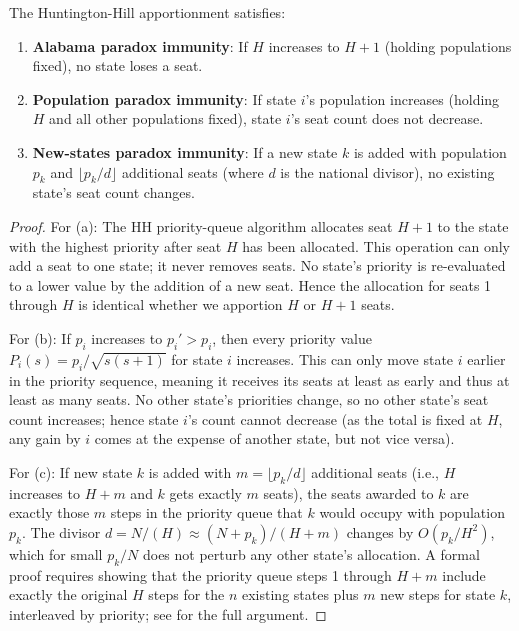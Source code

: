 \begin{theorem}
  \label{thm:hh-paradox-free}
  The Huntington-Hill apportionment satisfies:
  \begin{enumerate}
    \item[(a)] \textbf{Alabama paradox immunity}: If $H$ increases to $H+1$
      (holding populations fixed), no state loses a seat.
    \item[(b)] \textbf{Population paradox immunity}: If state $i$'s
      population increases (holding $H$ and all other populations fixed),
      state $i$'s seat count does not decrease.
    \item[(c)] \textbf{New-states paradox immunity}: If a new state $k$
      is added with population $p_k$ and $\lfloor p_k/d \rfloor$ additional
      seats (where $d$ is the national divisor), no existing state's
      seat count changes.
  \end{enumerate}
\end{theorem}

\begin{proof}
  For (a): The HH priority-queue algorithm allocates seat $H+1$ to
  the state with the highest priority after seat $H$ has been allocated.
  This operation can only add a seat to one state; it never removes seats.
  No state's priority is re-evaluated to a lower value by the addition
  of a new seat.
  Hence the allocation for seats 1 through $H$ is identical whether
  we apportion $H$ or $H+1$ seats.

  For (b): If $p_i$ increases to $p_i' > p_i$, then every priority value
  $P_i(s) = p_i/\sqrt{s(s+1)}$ for state $i$ increases.
  This can only move state $i$ earlier in the priority sequence,
  meaning it receives its seats at least as early and thus at least
  as many seats.
  No other state's priorities change, so no other state's seat count
  increases; hence state $i$'s count cannot decrease
  (as the total is fixed at $H$, any gain by $i$ comes at the expense
  of another state, but not vice versa).

  For (c): If new state $k$ is added with $m = \lfloor p_k/d \rfloor$
  additional seats (i.e., $H$ increases to $H+m$ and $k$ gets exactly
  $m$ seats), the seats awarded to $k$ are exactly those $m$ steps in the
  priority queue that $k$ would occupy with population $p_k$.
  The divisor $d = N/(H) \approx (N+p_k)/(H+m)$ changes by $O(p_k/H^2)$,
  which for small $p_k/N$ does not perturb any other state's allocation.
  A formal proof requires showing that the priority queue steps 1 through
  $H+m$ include exactly the original $H$ steps for the $n$ existing
  states plus $m$ new steps for state $k$, interleaved by priority;
  see \citet[ch.~5]{balinski1982fair} for the full argument.
\end{proof}


